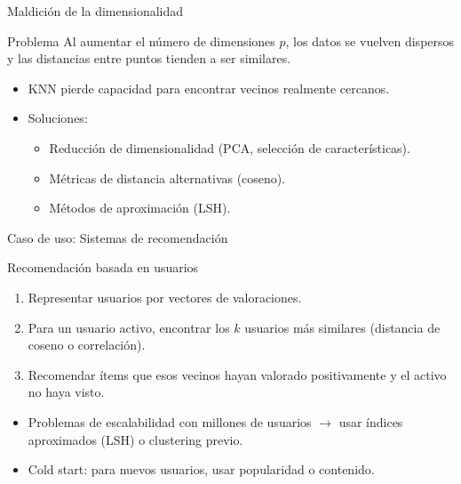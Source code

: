 \documentclass[aspectratio=169, 10pt, xcolor=table]{beamer}
\begin{document}
\begin{frame}{Maldición de la dimensionalidad}
    \begin{block}{Problema}
        Al aumentar el número de dimensiones $p$, los datos se vuelven dispersos y las distancias entre puntos tienden a ser similares.
    \end{block}
    \begin{itemize}
        \item KNN pierde capacidad para encontrar vecinos realmente cercanos.
        \item Soluciones:
        \begin{itemize}
            \item Reducción de dimensionalidad (PCA, selección de características).
            \item Métricas de distancia alternativas (coseno).
            \item Métodos de aproximación (LSH).
        \end{itemize}
    \end{itemize}
\end{frame}

\begin{frame}{Caso de uso: Sistemas de recomendación}
    \begin{exampleblock}{Recomendación basada en usuarios}
        \begin{enumerate}
            \item Representar usuarios por vectores de valoraciones.
            \item Para un usuario activo, encontrar los $k$ usuarios más similares (distancia de coseno o correlación).
            \item Recomendar ítems que esos vecinos hayan valorado positivamente y el activo no haya visto.
        \end{enumerate}
    \end{exampleblock}
    \begin{itemize}
        \item Problemas de escalabilidad con millones de usuarios $\rightarrow$ usar índices aproximados (LSH) o clustering previo.
        \item Cold start: para nuevos usuarios, usar popularidad o contenido.
    \end{itemize}
\end{frame}
\end{document}
